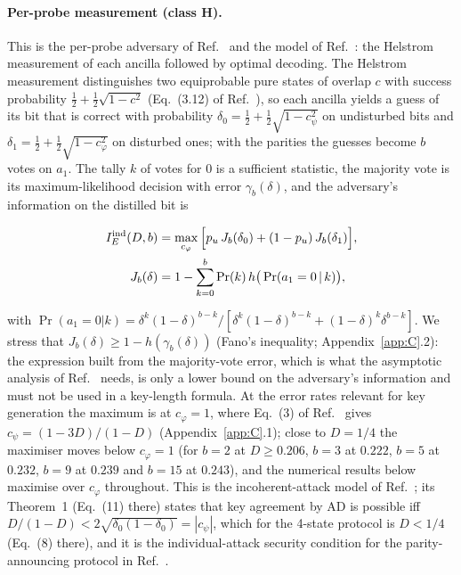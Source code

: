 \documentclass[aps,pra,twocolumn,superscriptaddress,nofootinbib]{revtex4-2}
\begin{document}
\paragraph*{Per-probe measurement (class H).} This is the per-probe adversary of Ref.~\cite{BA07} and the model of Ref.~\cite{GW99}: the Helstrom measurement of each ancilla followed by optimal decoding. The Helstrom measurement distinguishes two equiprobable pure states of overlap $c$ with success probability $\tfrac12+\tfrac12\sqrt{1-c^2}$ \cite{Hel76} (Eq.~(3.12) of Ref.~\cite{Fuchs96}), so each ancilla yields a guess of its bit that is correct with probability $\delta_0=\tfrac12+\tfrac12\sqrt{1-c_\psi^2}$ on undisturbed bits and $\delta_1=\tfrac12+\tfrac12\sqrt{1-c_\varphi^2}$ on disturbed ones; with the parities the guesses become $b$ votes on $a_1$. The tally $k$ of votes for 0 is a sufficient statistic, the majority vote is its maximum-likelihood decision with error $\gamma_b(\delta)$, and the adversary's information on the distilled bit is

\begin{align}
I_E^{\rm ind}(D,b)&=\max_{c_\varphi}\Big[p_u\,J_b(\delta_0)+(1-p_u)\,J_b(\delta_1)\Big],\label{eq:IEind}\\
J_b(\delta)&=1-\sum_{k=0}^{b}\Pr(k)\,h\big(\Pr(a_1=0\,|\,k)\big),\nonumber
\end{align}

with $\Pr(a_1=0|k)=\delta^k(1-\delta)^{b-k}/[\delta^k(1-\delta)^{b-k}+(1-\delta)^k\delta^{b-k}]$. We stress that $J_b(\delta)\ge 1-h(\gamma_b(\delta))$ (Fano's inequality; Appendix~\ref{app:C}.2): the expression built from the majority-vote error, which is what the asymptotic analysis of Ref.~\cite{GW99} needs, is only a lower bound on the adversary's information and must not be used in a key-length formula. At the error rates relevant for key generation the maximum is at $c_\varphi=1$, where Eq.~(3) of Ref.~\cite{GW99} gives $c_\psi=(1-3D)/(1-D)$ (Appendix~\ref{app:C}.1); close to $D=1/4$ the maximiser moves below $c_\varphi=1$ (for $b=2$ at $D\ge0.206$, $b=3$ at $0.222$, $b=5$ at $0.232$, $b=9$ at $0.239$ and $b=15$ at $0.243$), and the numerical results below maximise over $c_\varphi$ throughout. This is the incoherent-attack model of Ref.~\cite{GW99}; its Theorem~1 (Eq.~(11) there) states that key agreement by AD is possible iff $D/(1-D)<2\sqrt{\delta_0(1-\delta_0)}=|c_\psi|$, which for the 4-state protocol is $D<1/4$ (Eq.~(8) there), and it is the individual-attack security condition for the parity-announcing protocol in Ref.~\cite{BA07}.
\end{document}
